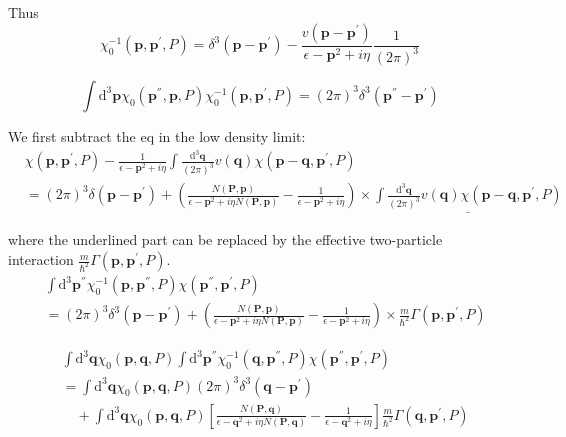 Thus
\[ \chi_0^{-1}(\mathbf{p},\mathbf{p}^{'},P) = \delta^3(\mathbf{p}-\mathbf{p}^{'}) - \frac{v(\mathbf{p}-\mathbf{p}^{'})}{\epsilon-\mathbf{p}^2+i \eta} \frac{1}{(2\pi)^3} \]

\[ \int \mathrm{d}^3 \mathbf{p} \chi_0(\mathbf{p}^{''},\mathbf{p},P)\chi_0^{-1}(\mathbf{p},\mathbf{p}^{'},P) = (2\pi)^3 \delta^3(\mathbf{p}^{''}-\mathbf{p}^{'})\]

We first subtract the eq in the low density limit:
\[ \begin{split} &\chi(\mathbf{p},\mathbf{p}^{'},P) - \frac{1}{\epsilon-\mathbf{p}^2+i \eta} \int \frac{\mathrm{d}^3 \mathbf{q}}{(2\pi)^3} v(\mathbf{q}) \chi(\mathbf{p}-\mathbf{q},\mathbf{p}^{'},P)\\
&=(2\pi)^3 \delta(\mathbf{p}-\mathbf{p}^{'}) + \left( \frac{N(\mathbf{P},\mathbf{p})}{\epsilon - \mathbf{p}^2+i \eta N(\mathbf{P},\mathbf{p})} - \frac{1}{\epsilon - \mathbf{p}^2+i \eta} \right)\times \underline{\int \frac{\mathrm{d}^3 \mathbf{q}}{(2\pi)^3} v(\mathbf{q})\chi(\mathbf{p}-\mathbf{q},\mathbf{p}^{'},P)}
\end{split} \]

where the underlined part can be replaced by the effective two-particle interaction $\frac{m}{\hbar^2}\Gamma(\mathbf{p},\mathbf{p}^{'},P)$.
\[ \begin{split} &\int \mathrm{d}^3 \mathbf{p}^{''} \chi_0^{-1}(\mathbf{p},\mathbf{p}^{''},P)\chi(\mathbf{p}^{''},\mathbf{p}^{'},P)\\
&=(2\pi)^3 \delta^3(\mathbf{p}-\mathbf{p}^{'}) + \left( \frac{N(\mathbf{P},\mathbf{p})}{\epsilon - \mathbf{p}^2+i \eta N(\mathbf{P},\mathbf{p})} - \frac{1}{\epsilon - \mathbf{p}^2+i \eta} \right)\times\frac{m}{\hbar^2}\Gamma(\mathbf{p},\mathbf{p}^{'},P)
\end{split} \]

\[ \begin{split} &\int \mathrm{d}^3\mathbf{q} \chi_0(\mathbf{p},\mathbf{q},P) \int \mathrm{d}^3 \mathbf{p}^{''} \chi_0^{-1}(\mathbf{q},\mathbf{p}^{''},P)\chi(\mathbf{p}^{''},\mathbf{p}^{'},P)\\
&= \int \mathrm{d}^3\mathbf{q}\chi_0(\mathbf{p},\mathbf{q},P)(2\pi)^3\delta^3(\mathbf{q}-\mathbf{p}^{'})\\&\quad+ \int \mathrm{d}^3 \mathbf{q} \chi_0(\mathbf{p},\mathbf{q},P) \left[ \frac{N(\mathbf{P},\mathbf{q})}{\epsilon - \mathbf{q}^2+i \eta N(\mathbf{P},\mathbf{q})} - \frac{1}{\epsilon - \mathbf{q}^2+i \eta} \right] \frac{m}{\hbar^2} \Gamma(\mathbf{q},\mathbf{p}^{'},P)
\end{split} \]



